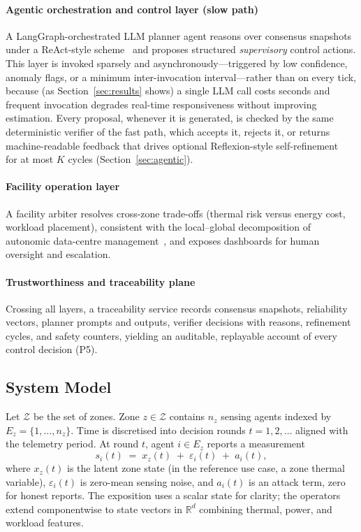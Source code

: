 \documentclass[preprint,11pt]{elsarticle}
\newcommand{\R}{\mathbb{R}}
\begin{document}
\paragraph{Agentic orchestration and control layer (slow path)}
A LangGraph-orchestrated LLM planner agent reasons over consensus
snapshots under a ReAct-style scheme~\cite{yao2023react} and proposes
structured \emph{supervisory} control actions. This layer is invoked
sparsely and asynchronously---triggered by low confidence, anomaly
flags, or a minimum inter-invocation interval---rather than on every
tick, because (as Section~\ref{sec:results} shows) a single LLM call
costs seconds and frequent invocation degrades real-time responsiveness
without improving estimation. Every proposal, whenever it is generated,
is checked by the same deterministic verifier of the fast path, which
accepts it, rejects it, or returns machine-readable feedback that drives
optional Reflexion-style self-refinement~\cite{shinn2023reflexion} for
at most $K$ cycles (Section~\ref{sec:agentic}).

\paragraph{Facility operation layer}
A facility arbiter resolves cross-zone trade-offs (thermal risk versus
energy cost, workload placement), consistent with the local--global
decomposition of autonomic data-centre
management~\cite{das2008,tesauro2004}, and exposes dashboards for human
oversight and escalation.

\paragraph{Trustworthiness and traceability plane}
Crossing all layers, a traceability service records consensus
snapshots, reliability vectors, planner prompts and outputs, verifier
decisions with reasons, refinement cycles, and safety counters,
yielding an auditable, replayable account of every control decision
(P5).

\subsection{System Model}
\label{sec:sysmodel}

Let $\mathcal{Z}$ be the set of zones. Zone $z\in\mathcal{Z}$ contains
$n_z$ sensing agents indexed by $E_z=\{1,\dots,n_z\}$. Time is
discretised into decision rounds $t=1,2,\dots$ aligned with the
telemetry period. At round $t$, agent $i\in E_z$ reports a measurement
\begin{equation}
s_i(t) \;=\; x_z(t) \;+\; \varepsilon_i(t) \;+\; a_i(t),
\label{eq:obsmodel}
\end{equation}
where $x_z(t)$ is the latent zone state (in the reference use case, a
zone thermal variable), $\varepsilon_i(t)$ is zero-mean sensing noise,
and $a_i(t)$ is an attack term, zero for honest reports. The exposition
uses a scalar state for clarity; the operators extend componentwise to
state vectors in $\R^d$ combining thermal, power, and workload
features.
\end{document}
